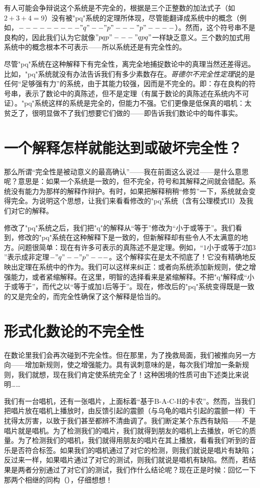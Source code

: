 有人可能会争辩说这个系统是不完全的，根据是三个正整数的加法式子（如$2+3+4=9$）没有被"pq"系统的定理所体现，尽管能翻译成系统中的概念（例如，$---------"q"--"p"---"p"----$）。然而，这个符号串不是良构的，因此我们认为它就像$"pqp"---"qpq"$一样缺乏意义。三个数的加式用系统中的概念根本不可表示——所以系统还是有完全性的。

尽管"pq"系统在这种解释下有完全性，离完全地捕捉数论中的真理当然还差得远。比如，"pq"系统就没有办法告诉我们有多少素数存在。\emph{哥德尔不完全性定理}说的是任何“足够强有力”的系统，由于其能力较强，因而是不完全的。即：存在良构的符号串，表示了数论中的真陈述，但不是定理（有属于数论的真陈述在系统内不可证）。"pq"系统这样的系统是完全的，但能力不强。它们更像是低保真的唱机：太贫乏了，很明显做不了我们想要它们做的——即告诉我们数论中的每件事实。

\section{一个解释怎样就能达到或破坏完全性？}

那么所谓“完全性是被动意义的最高确认”——我在前面这么说过——是什么意思呢？意思是：如果一个系统是一致的，但不完全，符号和其解释之间就会错配。系统没有能力为那样的解释作辩护。有时，如果把解释稍稍“修剪”一下，系统就会变得完全。为说明这个思想，让我们来看看修改的"pq"系统（含有公理模式II）及我们对它的解释。

修改了"pq"系统之后，我们把"q"的解释从“等于”修改为“小于或等于”。我们看到，修改的"pq"系统在这种解释下是一致的，但新解释却有些令人不太满意的地方。问题很简单：现在有许多可表示的真陈述不是定理。例如，“$1$小于或等于$2$加$3$”表示成非定理$-"q"--"p"---$。这个解释实在是太不彻底了！它没有精确地反映出定理在系统中的作为。我们可以这样来纠正：或者向系统添加新规则，使之增强能力，或者紧缩解释。在这里，明智的选择看来是紧缩解释。不把"q"解释成“小于或等于”，而代之以“等于或加$1$后等于”。现在，修改后的"pq"系统变得既是一致的又是完全的，而完全性确保了这个解释是恰当的。

\section{形式化数论的不完全性}

在数论里我们会再次碰到不完全性。但在那里，为了挽救局面，我们被推向另一方向——增加新规则，使之增强能力。具有讽刺意味的是，每次我们增加一条新规则，我们就想，现在我们肯定使系统完全了！这种困境的性质可由下述类比来说明……

我们有一台唱机，还有一张唱片，上面标着“基于B-A-C-H的卡农”。然而，当我们把唱片放在唱机上播放时，由反馈引起的震颤（与乌龟的唱片引起的震颤一样）干扰得太厉害，以致于我们甚至都辨不清曲调了。我们断定某个东西有缺陷——不是唱片就是唱机。为了检测我们的唱片，我们就得到朋友的唱机上去播放，听它的质量。为了检测我们的唱机，我们就得用朋友的唱片在其上播放，看看我们听到的音乐是否符合标签。如果我们的唱机通过了对它的检测，则我们就说是唱片有缺陷；反过来一样，如果唱片通过了对它的测试，则我们就说是唱机有缺陷。然而，若结果是两者分别通过了对它们的测试，我们作什么结论呢？现在正是时候：回忆一下那两个相继的同构（），仔细想想！
